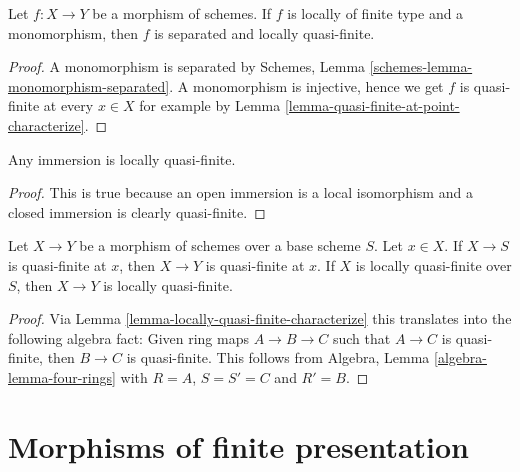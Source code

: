 \begin{lemma}
\label{lemma-monomorphism-loc-finite-type-loc-quasi-finite}
Let $f : X \to Y$ be a morphism of schemes.
If $f$ is locally of finite type and a monomorphism, then $f$
is separated and locally quasi-finite.
\end{lemma}

\begin{proof}
A monomorphism is separated by Schemes, Lemma
\ref{schemes-lemma-monomorphism-separated}.
A monomorphism is injective, hence we get $f$
is quasi-finite at every $x \in X$ for example by
Lemma \ref{lemma-quasi-finite-at-point-characterize}.
\end{proof}

\begin{lemma}
\label{lemma-immersion-locally-quasi-finite}
Any immersion is locally quasi-finite.
\end{lemma}

\begin{proof}
This is true because an open immersion is a local isomorphism
and a closed immersion is clearly quasi-finite.
\end{proof}

\begin{lemma}
\label{lemma-permanence-quasi-finite}
Let $X \to Y$ be a morphism of schemes over a base scheme $S$.
Let $x \in X$. If $X \to S$ is quasi-finite at $x$, then
$X \to Y$ is quasi-finite at $x$.
If $X$ is locally quasi-finite over $S$, then $X \to Y$
is locally quasi-finite.
\end{lemma}

\begin{proof}
Via Lemma \ref{lemma-locally-quasi-finite-characterize} this translates
into the following algebra
fact: Given ring maps $A \to B \to C$ such that $A \to C$ is
quasi-finite, then $B \to C$ is quasi-finite.
This follows from
Algebra, Lemma \ref{algebra-lemma-four-rings}
with $R = A$, $S = S' = C$ and $R' = B$.
\end{proof}















\section{Morphisms of finite presentation}
\label{section-finite-presentation}

